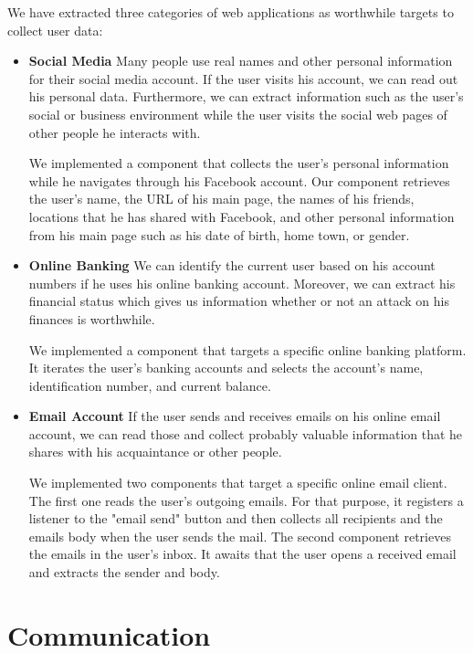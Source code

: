 	We have extracted three categories of web applications as worthwhile targets to collect user data:
	\begin{itemize}
		\item \textbf{Social Media} Many people use real names and other personal information for their social media account. If the user visits his account, we can read out his personal data. Furthermore, we can extract information such as the user's social or business environment while the user visits the social web pages of other people he interacts with. 
		
		We implemented a component that collects the user's personal information while he navigates through his Facebook account. Our component retrieves the user's name, the URL of his main page, the names of his friends, locations that he has shared with Facebook, and other personal information from his main page such as his date of birth, home town, or gender.
		
		\item \textbf{Online Banking} We can identify the current user based on his account numbers if he uses his online banking account. Moreover, we can extract his financial status which gives us information whether or not an attack on his finances is worthwhile.
		
		We implemented a component that targets a specific online banking platform. It iterates the user's banking accounts and selects the account's name, identification number, and current balance.
		
		\item \textbf{Email Account} If the user sends and receives emails on his online email account, we can read those and collect probably valuable information that he shares with his acquaintance or other people.
		
		We implemented two components that target a specific online email client. The first one reads the user's outgoing emails. For that purpose, it registers a listener to the "email send" button and then collects all recipients and the emails body when the user sends the mail. The second component retrieves the emails in the user's inbox. It awaits that the user opens a received email and extracts the sender and body.
	\end{itemize}
	
\clearpage
\section{Communication}
\label{sec:communication}

